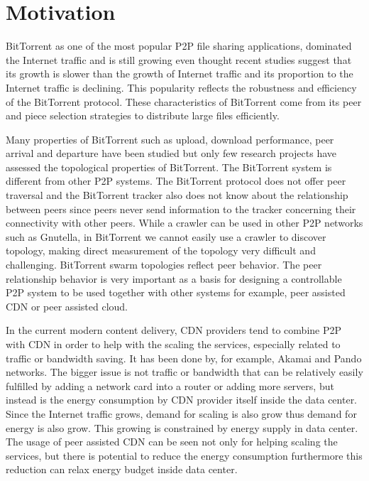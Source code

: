\section{Motivation}
BitTorrent as one of the most popular P2P file sharing applications, dominated the Internet traffic and is still growing even thought recent studies suggest that its growth is slower than the growth of Internet traffic and its proportion to the Internet traffic is declining.
This popularity reflects the robustness and efficiency of the BitTorrent protocol.
These characteristics of BitTorrent come from its peer and piece selection strategies to distribute large files efficiently.  

Many properties of BitTorrent such as upload, download performance, peer arrival and departure have been studied but only few research projects have assessed the topological properties of BitTorrent.  
The BitTorrent system is different from other P2P systems. 
The BitTorrent protocol does not offer peer traversal and the BitTorrent tracker also does not know about the relationship between peers since peers never send information to the tracker concerning their connectivity with other peers.  
While a crawler can be used in other P2P networks such as Gnutella, in BitTorrent we cannot easily use a crawler to discover topology, making direct measurement of the topology very difficult and challenging. 
BitTorrent swarm topologies reflect peer behavior.
The peer relationship behavior is very important as a basis for designing a controllable P2P system to be used together with other systems for example, peer assisted CDN or peer assisted cloud. 

In the current modern content delivery, CDN providers tend to combine P2P with CDN in order to help with the scaling the services, especially related to traffic or bandwidth saving.
It has been done by, for example, Akamai and Pando networks.
The bigger issue is not traffic or bandwidth that can be relatively easily fulfilled by adding a network card into a router or adding more servers, but  instead is the energy consumption by CDN provider itself inside the data center.
Since the Internet traffic grows, demand for scaling is also grow thus demand for energy is also grow.  
This growing is constrained by energy supply in data center.
The usage of peer assisted CDN can be seen not only for helping scaling the services, but there is potential to reduce the energy consumption furthermore this reduction can relax energy budget inside data center. 


